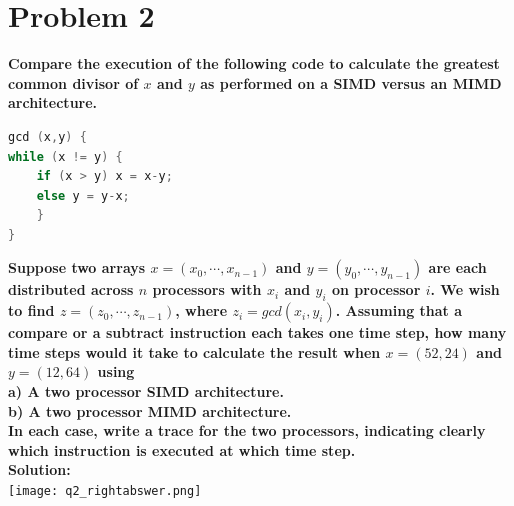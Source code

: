 \documentclass{article}
\begin{document}
\section{Problem 2}
\textcolor[rgb]{0,0,1}{\textbf{Compare the execution of the following code to calculate the greatest common divisor of $x$ and $y$ as performed on a SIMD versus an MIMD architecture. }}
\begin{lstlisting}[language=c++]
gcd (x,y) {
while (x != y) {
    if (x > y) x = x-y;
    else y = y-x;
    }
}
\end{lstlisting}
\textcolor[rgb]{0,0,1}{\textbf{Suppose two arrays $x = (x_{0},\cdots, x_{n-1})$ and $y = (y_{0},\cdots, y_{n-1})$ are each distributed across $n$ processors with $x_{i}$ and $y_{i}$ on processor $i$. We wish to find $z = (z_{0},\cdots, z_{n-1})$, where $z_{i} = gcd(x_{i}, y_{i})$. Assuming that a compare or a subtract instruction 
each takes one time step, how many time steps would it take to calculate the 
result when $x = (52,24)$ and $y = (12, 64)$ using\\
a) A two processor SIMD architecture. \\ 
b) A two processor MIMD architecture. \\
In each case, write a trace for the two processors, indicating clearly which 
instruction is executed at which time step.\\}}
\textbf{Solution: }\\
\texttt{[image: q2\_rightabswer.png]}
\end{document}

